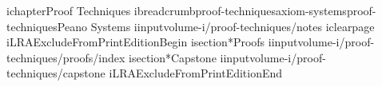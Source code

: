 ichapter{Proof Techniques}
ibreadcrumb{proof-techniques}{axiom-systems}{proof-techniques}{Peano Systems}
iinput{volume-i/proof-techniques/notes}
iclearpage
iLRAExcludeFromPrintEditionBegin
isection*{Proofs}
iinput{volume-i/proof-techniques/proofs/index}
isection*{Capstone}
iinput{volume-i/proof-techniques/capstone}
iLRAExcludeFromPrintEditionEnd
